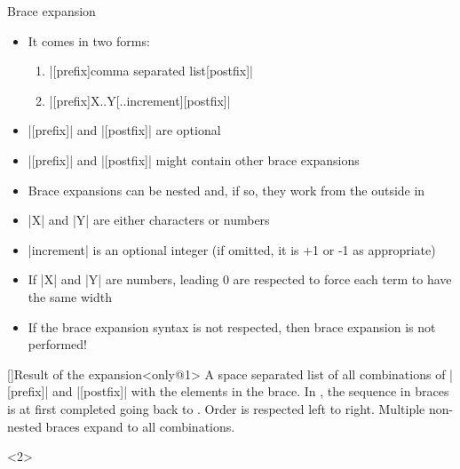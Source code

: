 \begin{frame}[fragile]{Brace expansion}
    \vspace{-6mm}
    \begin{overlayarea}{\textwidth}{0.7\textheight}
        \begin{itemize}
            \item It comes in two forms:
                \begin{enumerate}
                    \item \bash|[prefix]{comma separated list}[postfix]|
                    \item \bash|[prefix]{X..Y[..increment]}[postfix]|
                \end{enumerate}
            \item<only@1> \bash|[prefix]| and \bash|[postfix]| are optional 
            \item<only@1> \bash|[prefix]| and \bash|[postfix]| might contain other brace expansions
            \item<only@1> Brace expansions can be nested and, if so, they work from the outside in
            \item<only@1> \bash|X| and \bash|Y| are either characters or numbers
            \item<only@1> \bash|increment| is an optional integer (if omitted, it is +1 or -1 as appropriate)
            \item<only@1> If \bash|X| and \bash|Y| are numbers, leading 0 are respected to force each term to have the same width
            \item<only@1> If the brace expansion syntax is not respected, then brace expansion is not performed!
        \end{itemize}
        \vspace{-3mm}
        \begin{varblock}{}[\textwidth]{Result of the expansion}<only@1>
            A space separated list of all combinations of \bash|[prefix]| and \bash|[postfix]| with the elements in the brace.
            In , the sequence in braces is at first completed going back to .
            Order is respected left to right. Multiple non-nested braces expand to all combinations.
        \end{varblock}
        \begin{onlyenv}<2>
            \begin{lstlisting}[style=MyBash, style=oddnumbers, aboveskip=5mm]

\end{lstlisting}
\end{onlyenv}
\end{overlayarea}
\end{frame}
